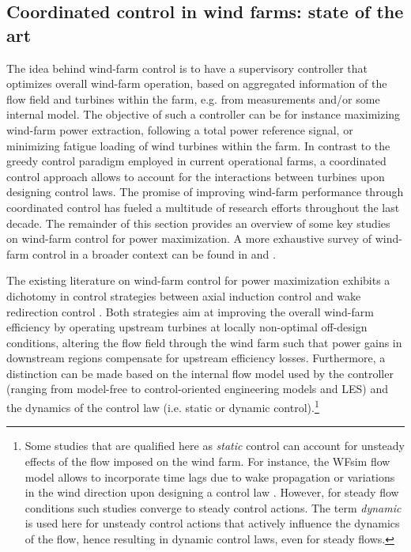 \subsection{Coordinated control in wind farms: state of the art}
The idea behind wind-farm control is to have a supervisory controller that optimizes overall wind-farm operation, based on aggregated information of the flow field and turbines within the farm, e.g. from measurements and/or some internal model. The objective of such a controller can be for instance maximizing wind-farm power extraction, following a total power reference signal, or minimizing fatigue loading of wind turbines within the farm. In contrast to the greedy control paradigm employed in current operational farms, a coordinated control approach allows to account for the interactions between turbines upon designing control laws. The promise of improving wind-farm performance through coordinated control has fueled a multitude of research efforts throughout the last decade. The remainder of this section provides an overview of some key studies on wind-farm control for power maximization. A more exhaustive survey of wind-farm control in a broader context can be found in \cite{knudsen2015survey} and \cite{boersma2017tutorial}.

The existing literature on wind-farm control for power maximization exhibits a dichotomy in control strategies between axial induction control and wake redirection control \citep{boersma2017tutorial}. Both strategies aim at improving the overall wind-farm efficiency by operating upstream turbines at locally non-optimal off-design conditions, altering the flow field through the wind farm such that power gains in downstream regions compensate for upstream efficiency losses. Furthermore, a distinction can be made based on the internal flow model used by the controller (ranging from model-free to control-oriented engineering models and LES) and the dynamics of the control law (i.e. static or dynamic control).\footnote{Some studies that are qualified here as \emph{static} control can account for unsteady effects of the flow imposed on the wind farm. For instance, the WFsim flow model allows to incorporate time lags due to wake propagation or variations in the wind direction upon designing a control law \citep{boersma2016control,vali2017adjoint}. However, for steady flow conditions such studies converge to steady control actions. The term \emph{dynamic} is used here for unsteady control actions that actively influence the dynamics of the flow, hence resulting in dynamic control laws, even for steady flows.}

